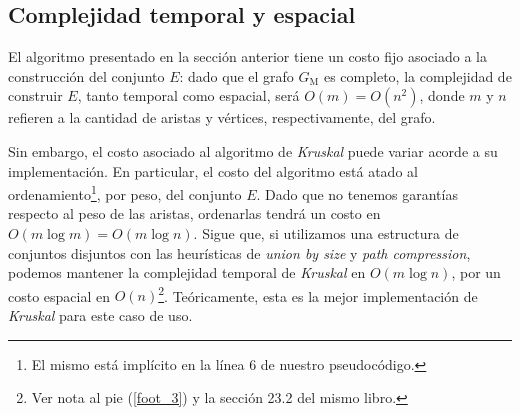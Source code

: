 \subsection{Complejidad temporal y espacial} El algoritmo presentado en la sección anterior tiene un costo fijo asociado a la construcción del conjunto $E$: dado que el grafo $G_\text{M}$ es completo, la complejidad de construir $E$, tanto temporal como espacial, será $O(m) = O(n^2)$, donde $m$ y $n$ refieren a la cantidad de aristas y vértices, respectivamente, del grafo. 

Sin embargo, el costo asociado al algoritmo de  \textit{Kruskal} puede variar acorde a su implementación. En particular, el costo del algoritmo está atado al ordenamiento\footnote{ El mismo está implícito en la línea $6$ de nuestro pseudocódigo.}, por peso, del conjunto $E$. Dado que no tenemos garantías respecto al peso de las aristas, ordenarlas tendrá un costo en $O(m\log m) = O(m \log n)$. Sigue que, si utilizamos una estructura de conjuntos disjuntos con las heurísticas de \textit{union by size} y \textit{path compression}, podemos mantener la complejidad temporal de \textit{Kruskal} en $O(m\log n)$, por un costo espacial en $O(n)$\footnote{Ver nota al pie (\ref{foot_3}) y la sección 23.2 del mismo libro.}. Teóricamente, esta es la mejor implementación de \textit{Kruskal} para este caso de uso. 
